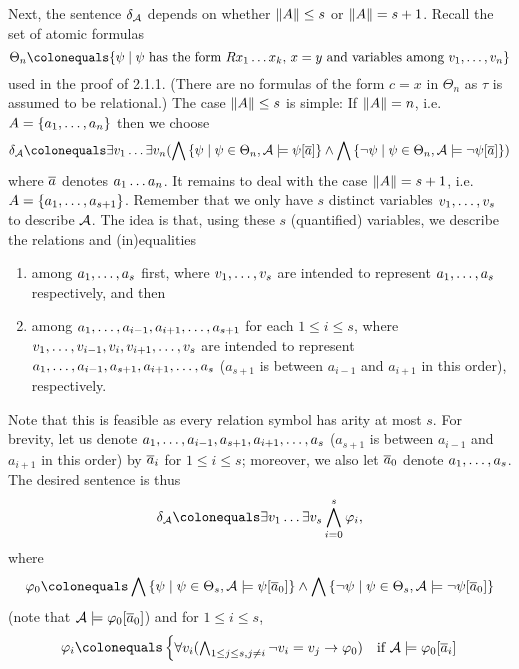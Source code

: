\begin{enumerate}[1.]
\begin{enumerate}[(a)]
\newpar
Next, the sentence $\delta_{\mathcal{A}}$ depends on whether $\|A\| \leq s$ or $\|A\| = s + 1$. Recall the set of atomic formulas
\[
\Theta_n \defas \sett{\psi}{\mathmode{\psi} has the form \mathmode{Rx_1 \etc x_k}, \mathmode{x = y} and variables among \mathmode{v_1, \etc, v_n}}
\]
used in the proof of 2.1.1. (There are no formulas of the form $c = x$ in $\Theta_n$ as $\tau$ is assumed to be relational.)
\newpar
The case $\|A\| \leq s$ is simple: If $\|A\| = n$, i.e.\ $A = {\{a_1, \ldots, a_n\}}$ then we choose
\[
\delta_\strct{A} \defas \exists v_1 \etc \exists v_n (\bland\setm{\psi}{\psi \in \Theta_n, \strct{A} \satis \psi[\vect{a}]} \land \bland\setm{\neg\psi}{\psi \in \Theta_n, \strct{A} \satis \neg\psi[\vect{a}]})
\]
where $\overline{a}$ denotes $a_1 \ldots a_n$.
\newpar
It remains to deal with the case $\|A\| = s + 1$, i.e.\ $A = {\{a_1, \ldots, a_{s + 1}\}}$. Remember that we only have $s$ distinct variables $v_1, \ldots, v_s$ to describe $\mathcal{A}$. The idea is that, using these $s$ (quantified) variables, we describe the relations and (in)equalities
\begin{enumerate}[(1)]
\item among $a_1, \ldots, a_s$ first, where $v_1, \ldots, v_s$ are intended to represent $a_1, \ldots, a_s$ respectively, and then
\item among $a_1, \ldots, a_{i - 1}, a_{i + 1}, \ldots, a_{s + 1}$ for each $1 \leq i \leq s$, where $v_1, \ldots, v_{i - 1}, v_i, v_{i + 1}, \ldots, v_s$ are intended to represent $a_1, \ldots, a_{i - 1}, a_{s + 1}, a_{i + 1}, \ldots, a_s$ ($a_{s + 1}$ is between $a_{i - 1}$ and $a_{i + 1}$ in this order), respectively.
\end{enumerate}
Note that this is feasible as every relation symbol has arity at most $s$.
\newpar
For brevity, let us denote $a_1, \ldots, a_{i - 1}, a_{s + 1}, a_{i + 1}, \ldots, a_s$ ($a_{s + 1}$ is between $a_{i - 1}$ and $a_{i + 1}$ in this order) by $\overline{a}_i$ for $1 \leq i \leq s$; moreover, we also let $\overline{a}_0$ denote $a_1, \ldots, a_s$. The desired sentence is thus
\[
\delta_\strct{A} \defas \exists v_1 \etc \exists v_s \bland^s_{i = 0} \varphi_i,
\]
where
\[
\varphi_0 \defas \bland \setm{\psi}{\psi \in \Theta_s, \strct{A} \satis \psi[\vect{a}_0]} \land \bland \setm{\neg\psi}{\psi \in \Theta_s, \strct{A} \satis \neg\psi[\vect{a}_0]}
\]
(note that $\mathcal{A} \models \varphi_0[\overline{a}_0]$) and for $1 \leq i \leq s$,
\[
\varphi_i \defas
\begin{cases}
\forall v_i (\bland_{1 \leq j \leq s, j \neq i} \neg v_i = v_j \lthen \varphi_0) & \text{if \mathmode{\strct{A} \satis \varphi_0[\vect{a}_i]}}\cr

\end{cases}\]
\end{enumerate}
\end{enumerate}
